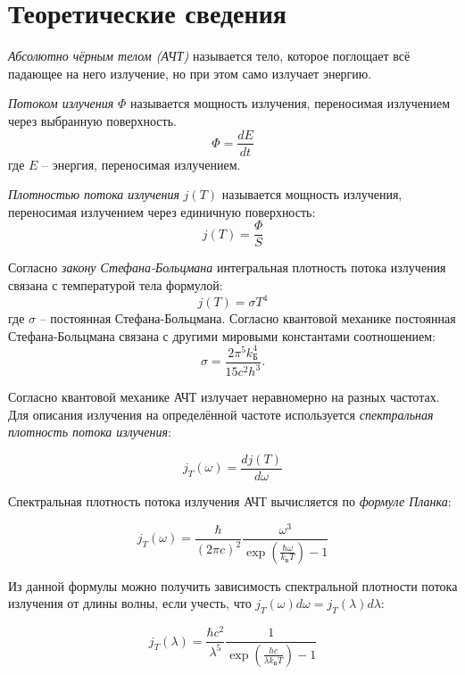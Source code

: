 \documentclass[a4paper, 12pt]{article}
\begin{document}
    \section{Теоретические сведения}
    
    \textit{Абсолютно чёрным телом (АЧТ)} называется тело, которое поглощает всё падающее на него излучение, но при этом само излучает энергию. 
	
    \textit{Потоком излучения} $\Phi$ называется мощность излучения, переносимая излучением через выбранную поверхность.
    $$
    \Phi = \frac{dE}{dt}
    $$
    где $E$ -- энергия, переносимая излучением.
	
    \textit{Плотностью потока излучения} $j(T)$ называется мощность излучения, переносимая излучением через единичную поверхность:
    $$
    j(T) = \frac{\Phi}{S}
    $$
	
    Согласно \textit{закону Стефана-Больцмана} интегральная плотность потока излучения связана с температурой тела формулой:
    \begin{equation}
        j(T) = \sigma T^4
        \label{eq:stefan_boltzman_law}
    \end{equation}
    где $\sigma$ -- постоянная Стефана-Больцмана. Согласно квантовой механике постоянная Стефана-Больцмана связана с другими мировыми константами соотношением:
	\begin{equation}
		\sigma = \frac{2 \pi^5 k_Б^4}{15 c^2 h^3}.
		\label{eq:const_stefan_boltzmann}
	\end{equation}
	
    Согласно квантовой механике АЧТ излучает неравномерно на разных частотах. Для описания излучения на определённой частоте используется \textit{спектральная плотность потока излучения}:
    
    $$
    j_T(\omega) = \frac{d j(T)}{d \omega}
    $$
    
    Спектральная плотность потока излучения АЧТ вычисляется по \textit{формуле Планка}:
    
    $$
    j_T(\omega) = \frac{\hbar}{\left(2 \pi c \right)^2} \frac{\omega^3}{\exp \left(\frac{\hbar \omega}{k_Б T}\right) - 1}
    $$
    
    Из данной формулы можно получить зависимость спектральной плотности потока излучения от длины волны, если учесть, что $j_T(\omega) d\omega = j_T(\lambda) d\lambda$:
    
    $$
    j_T(\lambda) = \frac{\hbar c^2}{\lambda^5}  \frac{1}{\exp \left(\frac{h c}{\lambda k_Б T}\right) - 1}
    $$
    
\end{document}
